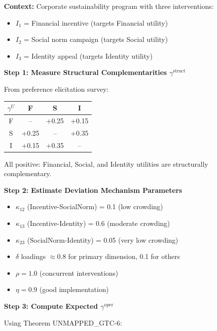 \begin{tcolorbox}[colback=gray!5!white, colframe=gray!75!black,
    title=Worked Example: Are Our $\gamma$ Values Consistent?]

\textbf{Context:} Corporate sustainability program with three interventions:
\begin{itemize}[nosep]
    \item $I_1$ = Financial incentive (targets Financial utility)
    \item $I_2$ = Social norm campaign (targets Social utility)
    \item $I_3$ = Identity appeal (targets Identity utility)
\end{itemize}

\textbf{Step 1: Measure Structural Complementarities $\gamma^{\text{struct}}$}

From preference elicitation survey:
\begin{center}
\begin{tabular}{c|ccc}
$\gamma^U$ & F & S & I \\
\hline
F & -- & +0.25 & +0.15 \\
S & +0.25 & -- & +0.35 \\
I & +0.15 & +0.35 & -- \\
\end{tabular}
\end{center}

All positive: Financial, Social, and Identity utilities are structurally complementary.

\textbf{Step 2: Estimate Deviation Mechanism Parameters}

\begin{itemize}[nosep]
    \item $\kappa_{12}$ (Incentive-SocialNorm) = 0.1 (low crowding)
    \item $\kappa_{13}$ (Incentive-Identity) = 0.6 (moderate crowding)
    \item $\kappa_{23}$ (SocialNorm-Identity) = 0.05 (very low crowding)
    \item $\delta$ loadings $\approx 0.8$ for primary dimension, 0.1 for others
    \item $\rho = 1.0$ (concurrent interventions)
    \item $\eta = 0.9$ (good implementation)
\end{itemize}

\textbf{Step 3: Compute Expected $\gamma^{\text{oper}}$}

Using Theorem UNMAPPED_GTC-6:


\end{tcolorbox}
